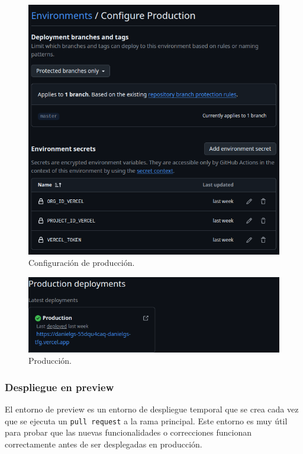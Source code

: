 \begin{figure}[H]
    \caption{Configuración de producción.}
    \centering
    \vspace*{0.5cm}
    \includegraphics[scale=0.25]{figuras/entorno_prod.png}
\end{figure}

\begin{figure}[H]
    \caption{Producción.}
    \centering
    \vspace*{0.5cm}
    \includegraphics[scale=0.25]{figuras/despliegue_prod.png}
\end{figure}

\subsubsection{Despliegue en preview}

El entorno de preview es un entorno de despliegue temporal que se crea cada vez que se ejecuta un \texttt{pull request} a la rama principal. Este entorno es muy útil para probar que las nuevas funcionalidades o correcciones funcionan correctamente antes de ser desplegadas en producción.

